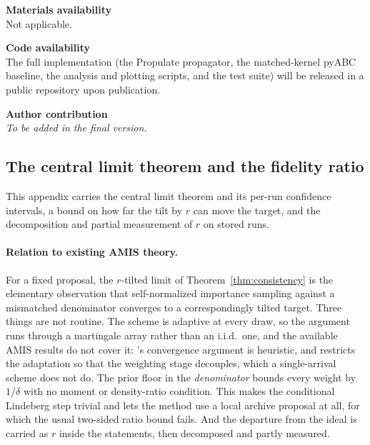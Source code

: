 \documentclass[pdflatex,sn-mathphys-num]{sn-jnl}
\theoremstyle{plain}
\theoremstyle{definition}
\begin{document}
\textbf{Materials availability} \\
Not applicable.

\textbf{Code availability} \\
The full implementation (the Propulate propagator, the matched-kernel pyABC baseline, the analysis and plotting scripts, and the test suite) will be released in a public repository upon publication.

\textbf{Author contribution} \\
\emph{To be added in the final version.}

\begin{appendices}

\section{The central limit theorem and the fidelity ratio}\label{app:theory-more}
This appendix carries the central limit theorem and its per-run confidence intervals, a bound on how far the tilt by $r$ can move the target, and the decomposition and partial measurement of $r$ on stored runs.

\paragraph{Relation to existing AMIS theory.} For a fixed proposal, the $r$-tilted limit of Theorem~\ref{thm:consistency} is the elementary observation that self-normalized importance sampling against a mismatched denominator converges to a correspondingly tilted target. Three things are not routine. The scheme is adaptive at every draw, so the argument runs through a martingale array rather than an i.i.d.\ one, and the available AMIS results do not cover it: \cite{cornuet2012amis}'s convergence argument is heuristic, and \cite{marin2019consistency} restricts the adaptation so that the weighting stage decouples, which a single-arrival scheme does not do. The prior floor in the \emph{denominator} bounds every weight by $1/\delta$ with no moment or density-ratio condition. This makes the conditional Lindeberg step trivial and lets the method use a local archive proposal at all, for which the usual two-sided ratio bound fails. And the departure from the ideal is carried as $r$ inside the statements, then decomposed and partly measured.


\end{appendices}
\end{document}
